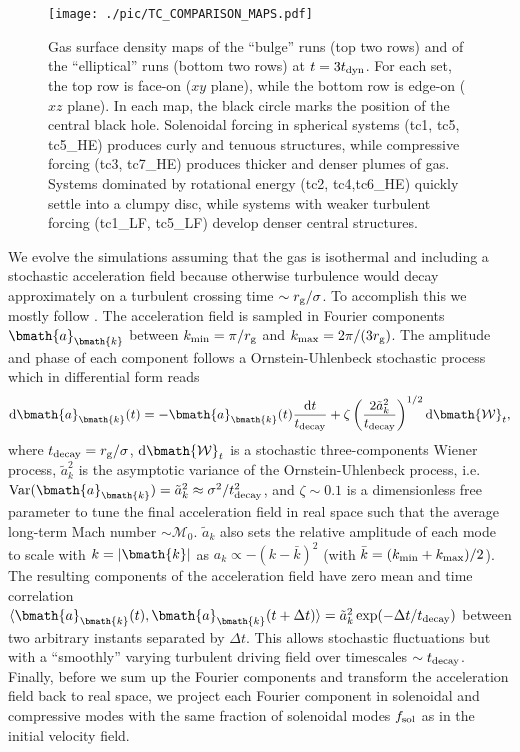 \documentclass[a4paper,fleqn,usenatbib]{mnras}
\begin{document}
\begin{figure*}
\begin{center}
\texttt{[image: ./pic/TC\_COMPARISON\_MAPS.pdf]}
\caption{Gas surface density maps of the ``bulge'' runs (top two rows) and of the ``elliptical'' runs (bottom two rows) at $t = 3 t_{\rm dyn}$. 
For each set, the top row is face-on ($xy$ plane), while the bottom row is edge-on ($xz$ plane).
In each map, the black circle marks the position of the central black hole.
Solenoidal forcing in spherical systems (tc1, tc5, tc5\_HE) produces curly and tenuous structures, while compressive forcing (tc3, tc7\_HE) produces thicker and denser plumes of gas.
Systems dominated by rotational energy (tc2, tc4,tc6\_HE) quickly settle into a clumpy disc, while systems with weaker turbulent forcing (tc1\_LF, tc5\_LF) develop denser central structures.
}
\label{fig_tc_comp_maps}
\end{center}
\end{figure*}

We evolve the simulations assuming that the gas is isothermal and including a stochastic acceleration field because otherwise turbulence would decay approximately on a turbulent crossing time $\sim r_{\rm g} / \sigma$.
To accomplish this we mostly follow \citet{bauer+12}.
The acceleration field is sampled in Fourier components $\bmath{a}_{\bmath{k}}$ between $k_{\rm min} = \pi/r_{\rm g}$ and $k_{\rm max} = 2 \pi / (3 r_{\rm g})$.
The amplitude and phase of each component follows a Ornstein-Uhlenbeck stochastic process which in differential form reads \citep{schmidt+06} 
\begin{equation}
{\rm d}\bmath{a}_{\bmath{k}}(t) = - \bmath{a}_{\bmath{k}}(t) \frac{{\rm d}t}{t_{\rm decay}} + \zeta \left( \frac{2 \tilde{a}^2_{k}}{t_{\rm decay}} \right)^{1/2} {\rm d}\bmath{\mathcal{W}}_{t}, 
\end{equation}
where $t_{\rm decay} = r_{\rm g} / \sigma$, ${\rm d}\bmath{\mathcal{W}}_t$ is a stochastic three-components Wiener process, $\tilde{a}^2_{k}$ is the asymptotic variance of the Ornstein-Uhlenbeck process, i.e. ${\rm Var}(\bmath{a}_{\bmath{k}}) = \tilde{a}^2_{k} \approx \sigma^2/t_{\rm decay}^2$, and $\zeta \sim 0.1$ is a dimensionless free parameter to tune the final acceleration field in real space such that the average long-term Mach number $\sim \mathcal{M}_{0}$.
$\tilde{a}_{k}$ also sets the relative amplitude of each mode to scale with $k = |\bmath{k}|$ as $a_{k} \propto -(k-\bar{k})^2$ (with $\bar{k} = (k_{\rm min} + k_{\rm max})/2$).
The resulting components of the acceleration field have zero mean and time correlation $\langle \bmath{a}_{\bmath{k}}(t), \bmath{a}_{\bmath{k}}(t+\Delta t) \rangle = \tilde{a}^2_{k} \exp(-\Delta t/t_{\rm decay})$ between two arbitrary instants separated by $\Delta t$.
This allows stochastic fluctuations but with a ``smoothly'' varying turbulent driving field over timescales $\sim t_{\rm decay}$.
Finally, before we sum up the Fourier components and transform the acceleration field back to real space, we project each Fourier component in solenoidal and compressive modes with the same fraction of solenoidal modes $f_{\rm sol}$ as in the initial velocity field.
\end{document}
